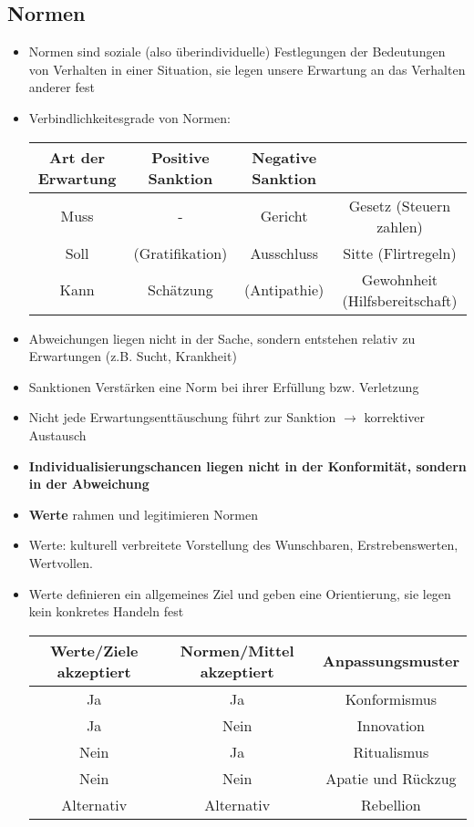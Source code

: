\documentclass{scrartcl}
\begin{document}
\subsection*{Normen}
\begin{itemize}
    \item
        Normen sind soziale (also überindividuelle) Festlegungen der Bedeutungen von Verhalten in einer Situation, sie legen unsere Erwartung an das Verhalten anderer fest
    \item
        Verbindlichkeitesgrade von Normen:
        \begin{center}
            \begin{tabular} { c | c | c | c }
                \hline
                Art der Erwartung & Positive Sanktion & Negative Sanktion & \\ \hline
                Muss & - & Gericht & Gesetz (Steuern zahlen)\\ \hline
                Soll & (Gratifikation) & Ausschluss & Sitte (Flirtregeln) \\ \hline
                Kann & Schätzung & (Antipathie) & Gewohnheit (Hilfsbereitschaft) \\ 
                \hline
            \end{tabular}
        \end{center}
    \item
        Abweichungen liegen nicht in der Sache, sondern entstehen relativ zu Erwartungen (z.B. Sucht, Krankheit)
    \item
        Sanktionen Verstärken eine Norm bei ihrer Erfüllung bzw. Verletzung
    \item
        Nicht jede Erwartungsenttäuschung führt zur Sanktion $\rightarrow$ korrektiver Austausch
    \item
        \textbf{Individualisierungschancen liegen nicht in der Konformität, sondern in der Abweichung}
    \item
        \textbf{Werte} rahmen und legitimieren Normen 
    \item     
        Werte: kulturell verbreitete Vorstellung des Wunschbaren, Erstrebenswerten, Wertvollen.
    \item
        Werte definieren ein allgemeines Ziel und geben eine Orientierung, sie legen kein konkretes Handeln fest
        \begin{center}
            \begin{tabular} { c | c | c }
                \hline
                Werte/Ziele akzeptiert & Normen/Mittel akzeptiert & Anpassungsmuster \\ \hline
                Ja & Ja & Konformismus \\ \hline
                Ja & Nein & Innovation \\ \hline
                Nein & Ja & Ritualismus \\ \hline
                Nein & Nein & Apatie und Rückzug \\ \hline
                Alternativ & Alternativ & Rebellion \\
                \hline
            \end{tabular}
        \end{center}
\end{itemize}
\end{document}

